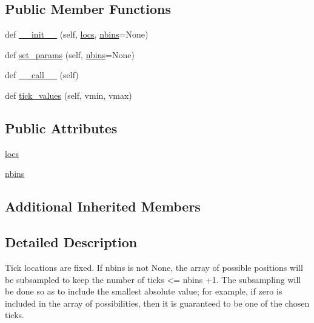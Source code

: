 \subsection*{Public Member Functions}
\begin{DoxyCompactItemize}
\item 
def \hyperlink{classmatplotlib_1_1ticker_1_1FixedLocator_a9aa8fdabfe5123838df9c573d617e74e}{\+\_\+\+\_\+init\+\_\+\+\_\+} (self, \hyperlink{classmatplotlib_1_1ticker_1_1FixedLocator_a596928f145ea696948664d3d4e3a386a}{locs}, \hyperlink{classmatplotlib_1_1ticker_1_1FixedLocator_aee404e722fd97a903090dc550063922d}{nbins}=None)
\item 
def \hyperlink{classmatplotlib_1_1ticker_1_1FixedLocator_ae52e2dfe1759fd53886d03a69421b9d2}{set\+\_\+params} (self, \hyperlink{classmatplotlib_1_1ticker_1_1FixedLocator_aee404e722fd97a903090dc550063922d}{nbins}=None)
\item 
def \hyperlink{classmatplotlib_1_1ticker_1_1FixedLocator_abbecee0b56cb23d2faa4cc47294b1535}{\+\_\+\+\_\+call\+\_\+\+\_\+} (self)
\item 
def \hyperlink{classmatplotlib_1_1ticker_1_1FixedLocator_a4190bcd5b00734d380b6e8fef61a5fbf}{tick\+\_\+values} (self, vmin, vmax)
\end{DoxyCompactItemize}
\subsection*{Public Attributes}
\begin{DoxyCompactItemize}
\item 
\hyperlink{classmatplotlib_1_1ticker_1_1FixedLocator_a596928f145ea696948664d3d4e3a386a}{locs}
\item 
\hyperlink{classmatplotlib_1_1ticker_1_1FixedLocator_aee404e722fd97a903090dc550063922d}{nbins}
\end{DoxyCompactItemize}
\subsection*{Additional Inherited Members}


\subsection{Detailed Description}
\begin{DoxyVerb}Tick locations are fixed.  If nbins is not None,
the array of possible positions will be subsampled to
keep the number of ticks <= nbins +1.
The subsampling will be done so as to include the smallest
absolute value; for example, if zero is included in the
array of possibilities, then it is guaranteed to be one of
the chosen ticks.
\end{DoxyVerb}
 

